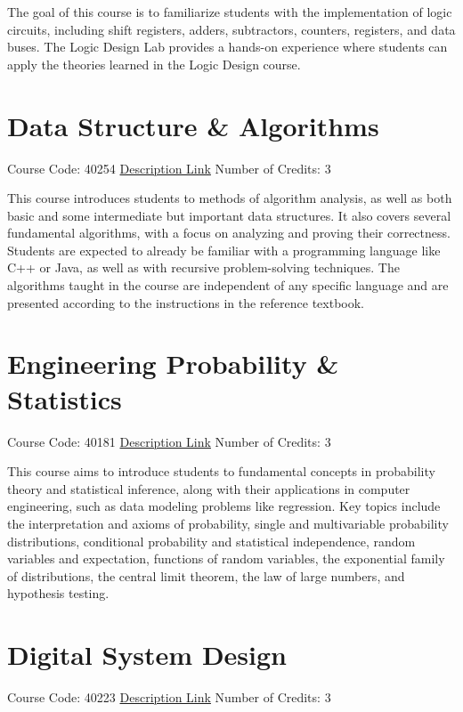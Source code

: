 The goal of this course is to familiarize students with the implementation of logic circuits, including shift registers, adders, subtractors, counters, registers, and data buses. The Logic Design Lab provides a hands-on experience where students can apply the theories learned in the Logic Design course.

\section{Data Structure \& Algorithms}
Course Code: 40254 \qquad \quad \href{https://docs.ce.sharif.edu/course/40254}{Description Link}
\qquad \quad Number of Credits: 3

This course introduces students to methods of algorithm analysis, as well as both basic and some intermediate but important data structures. It also covers several fundamental algorithms, with a focus on analyzing and proving their correctness. Students are expected to already be familiar with a programming language like C++ or Java, as well as with recursive problem-solving techniques. The algorithms taught in the course are independent of any specific language and are presented according to the instructions in the reference textbook.

\section{Engineering Probability \& Statistics}
Course Code: 40181 \qquad \quad \href{https://docs.ce.sharif.edu/course/40181}{Description Link}
\qquad \quad Number of Credits: 3

This course aims to introduce students to fundamental concepts in probability theory and statistical inference, along with their applications in computer engineering, such as data modeling problems like regression. Key topics include the interpretation and axioms of probability, single and multivariable probability distributions, conditional probability and statistical independence, random variables and expectation, functions of random variables, the exponential family of distributions, the central limit theorem, the law of large numbers, and hypothesis testing.


\section{Digital System Design}
Course Code: 40223 \qquad \quad \href{https://docs.ce.sharif.edu/course/40223}{Description Link}
\qquad \quad Number of Credits: 3

